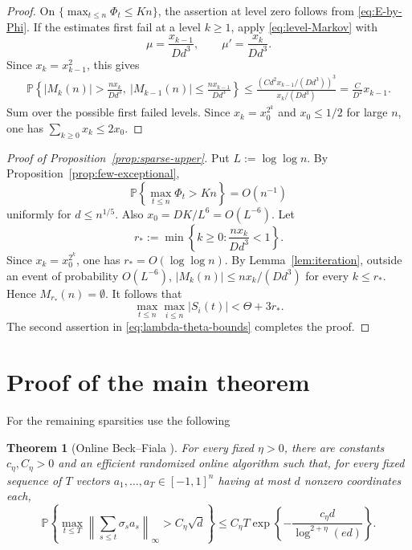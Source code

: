 \documentclass[reqno,english]{amsart}
\newcommand*{\PP}{\mathbb P}
\newtheorem{theorem}{Theorem}[section]
\theoremstyle{definition}
\begin{document}
\begin{proof}
On $\{\max_{t\le n}\Phi_t\le Kn\}$, the assertion at level zero follows
from \eqref{eq:E-by-Phi}.  If the estimates first fail at a level $k\ge1$,
apply \eqref{eq:level-Markov} with
\[
    \mu=\frac{x_{k-1}}{Dd^3},
    \qquad
    \mu'=\frac{x_k}{Dd^3}.
\]
Since $x_k=x_{k-1}^2$, this gives
\begin{align*}
\PP\left\{|M_k(n)|>\frac{nx_k}{Dd^3},\
              |M_{k-1}(n)|\le\frac{nx_{k-1}}{Dd^3}\right\}
\le
   \frac{\left(Cd^2x_{k-1}/(Dd^3)\right)^3}
        {x_k/(Dd^3)}
   =\frac{C}{D^2}x_{k-1}.
\end{align*}
Sum over the possible first failed levels.  Since
$x_k=x_0^{2^k}$ and $x_0\le1/2$ for large $n$, one has
$\sum_{k\ge0}x_k\le2x_0$.
\end{proof}

\begin{proof}[Proof of Proposition~\ref{prop:sparse-upper}]
Put $L:=\log\log n$.  By Proposition~\ref{prop:few-exceptional},
\[
 \PP\left\{\max_{t\le n}\Phi_t>Kn\right\}
 =O(n^{-1})
\]
uniformly for $d\le {n^{1/5}}$.  Also $x_0=DK/L^6=O(L^{-6})$.  Let
\[
    r_*:=\min\left\{k\ge0:\frac{nx_k}{Dd^3}<1\right\}.
\]
Since $x_k=x_0^{2^k}$, one has $r_*=O(\log\log n)$. By
Lemma~\ref{lem:iteration}, outside an event of probability $O(L^{-6})$,
$|M_k(n)|\le nx_k/(Dd^3)$ for every $k\le r_*$.  Hence
$M_{r_*}(n)=\emptyset$.
It follows that
\[
    \max_{t\le n}\max_{i\le n}|S_i(t)|<\Theta+3r_*.
\]
The second assertion in \eqref{eq:lambda-theta-bounds} completes the proof.
\end{proof}

\section{Proof of the main theorem}

For the remaining sparsities use the following

\begin{theorem}[Online Beck--Fiala \cite{altschuler-tikhomirov-bf}]
\label{thm:online-bf}
For every fixed $\eta>0$, there are constants $c_\eta,C_\eta>0$ and an
efficient randomized online algorithm such that, for every fixed sequence of
$T$ vectors $a_1,\ldots,a_T\in[-1,1]^n$ having at most $d$ nonzero coordinates
each,
\[
 \PP\left\{
   \max_{t\le T}\left\|\sum_{s\le t}\sigma_sa_s\right\|_\infty
   >C_\eta\sqrt d
 \right\}
 \le C_\eta T\exp\left\{-\frac{c_\eta d}{\log^{2+\eta}(ed)}\right\}.
\]
\end{theorem}
\end{document}
